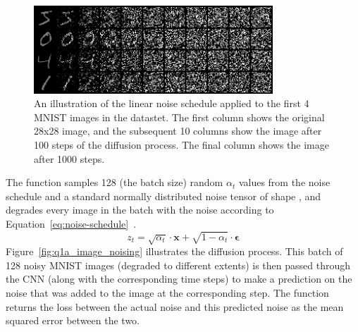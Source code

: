 \begin{figure}[t]
    \centering
    \includegraphics[width=0.8\textwidth]{figures/q1a_image_noising}
    \caption{An illustration of the linear noise schedule applied to the first 4 MNIST images in the datastet.
        The first column shows the original 28x28 image, and the subsequent 10 columns show the image after 100 steps
        of the diffusion process.
        The final column shows the image after 1000 steps.}
    \label{fig:q1a_image_noising}
\end{figure}

The  function samples 128 (the batch size) random $\alpha_{t}$ values from the noise schedule and
a standard normally distributed noise tensor of shape , and degrades every image in the batch
with the noise according to Equation~\eqref{eq:noise-schedule}~\cite{prince}.
\begin{equation}\label{eq:noise-schedule}
    z_{t} = \sqrt{\alpha_{t}} \cdot \mathbf{x} + \sqrt{1 - \alpha_{t}} \cdot \mathbf{\epsilon}
\end{equation}
Figure~\eqref{fig:q1a_image_noising} illustrates the diffusion process.
This batch of 128 noisy MNIST images (degraded to different extents) is then passed through the CNN (along with the
corresponding time steps) to make a prediction on the noise that was added to the image at the corresponding step.
The function returns the loss between the actual noise and this predicted noise as the mean squared error between the
two.

